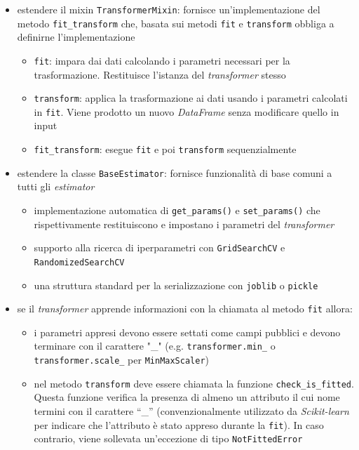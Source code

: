 \begin{itemize}
    \item estendere il mixin \texttt{TransformerMixin}: fornisce un'implementazione del metodo \texttt{fit\_transform} che, basata sui metodi \texttt{fit} e \texttt{transform} obbliga a definirne l'implementazione
    \begin{itemize}
        \item \texttt{fit}: impara dai dati calcolando i parametri necessari per la trasformazione. Restituisce l'istanza del \textit{transformer} stesso
        \item \texttt{transform}: applica la trasformazione ai dati usando i parametri calcolati in \texttt{fit}. Viene prodotto un nuovo \textit{DataFrame} senza modificare quello in input
        \item \texttt{fit\_transform}: esegue \texttt{fit} e poi \texttt{transform} sequenzialmente
    \end{itemize}
    \item estendere la classe \texttt{BaseEstimator}: fornisce funzionalità di base comuni a tutti gli \textit{estimator}
    \begin{itemize}
        \item implementazione automatica di \texttt{get\_params()} e \texttt{set\_params()} che rispettivamente restituiscono e impostano i parametri del \textit{transformer}
        \item supporto alla ricerca di iperparametri con \texttt{GridSearchCV} e \texttt{RandomizedSearchCV}
        \item una struttura standard per la serializzazione con \texttt{joblib} o \texttt{pickle}
    \end{itemize}
    \item se il \textit{transformer} apprende informazioni con la chiamata al metodo \texttt{fit} allora:
    \begin{itemize}
        \item i parametri appresi devono essere settati come campi pubblici e devono terminare con il carattere "\_" (e.g. \texttt{transformer.min\_} o \\ \texttt{transformer.scale\_} per \texttt{MinMaxScaler})
        \item nel metodo \texttt{transform} deve essere chiamata la funzione \texttt{check\_is\_fitted}. Questa funzione verifica la presenza di almeno un attributo il cui nome termini con il carattere ``\_'' (convenzionalmente utilizzato da \textit{Scikit-learn} per indicare che l'attributo è stato appreso durante la \texttt{fit}). In caso contrario, viene sollevata un'eccezione di tipo \texttt{NotFittedError}
    \end{itemize} 
\end{itemize}


